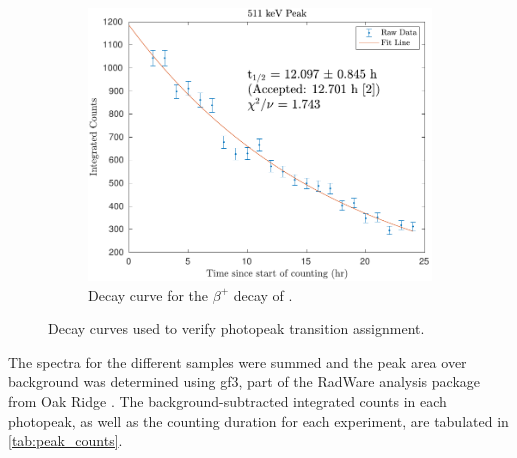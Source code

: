 \documentclass[5p]{elsarticle}
\begin{document}
\begin{figure}
\begin{subfigure}[t]{0.49\textwidth}
    \end{subfigure}
     \begin{subfigure}[t]{0.49\textwidth}
        \centering
        \includegraphics[scale=0.6]{./figures/511keV_curve_new.pdf}
        \caption{ Decay curve for the $\beta^+$ decay of .}
        \label{fig:decay_curve_511}
    \end{subfigure}%
    \caption{Decay curves used to verify photopeak transition assignment.}
     \label{fig:decay_curves}
\end{figure}

The spectra for the different samples were summed and the peak area over background was determined using gf3, part of the RadWare analysis package from Oak Ridge   \cite{radford2000radware, Radford1995}. The background-subtracted integrated counts in each photopeak, as well as the counting duration for each experiment, are tabulated in \autoref{tab:peak_counts}.
\end{document}
